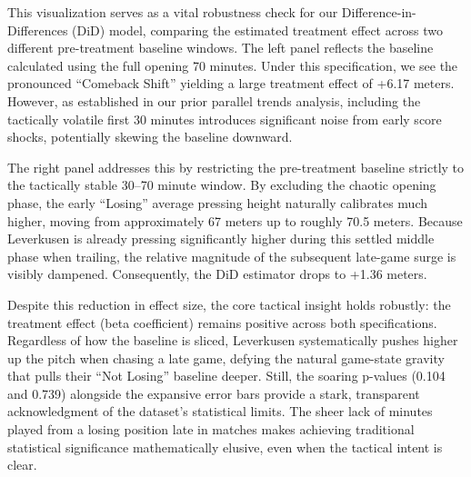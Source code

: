 \documentclass[
]{article}
\begin{document}
This visualization serves as a vital robustness check for our
Difference-in-Differences (DiD) model, comparing the estimated treatment
effect across two different pre-treatment baseline windows. The left
panel reflects the baseline calculated using the full opening 70
minutes. Under this specification, we see the pronounced ``Comeback
Shift'' yielding a large treatment effect of +6.17 meters. However, as
established in our prior parallel trends analysis, including the
tactically volatile first 30 minutes introduces significant noise from
early score shocks, potentially skewing the baseline downward.

The right panel addresses this by restricting the pre-treatment baseline
strictly to the tactically stable 30--70 minute window. By excluding the
chaotic opening phase, the early ``Losing'' average pressing height
naturally calibrates much higher, moving from approximately 67 meters up
to roughly 70.5 meters. Because Leverkusen is already pressing
significantly higher during this settled middle phase when trailing, the
relative magnitude of the subsequent late-game surge is visibly
dampened. Consequently, the DiD estimator drops to +1.36 meters.

Despite this reduction in effect size, the core tactical insight holds
robustly: the treatment effect (beta coefficient) remains positive
across both specifications. Regardless of how the baseline is sliced,
Leverkusen systematically pushes higher up the pitch when chasing a late
game, defying the natural game-state gravity that pulls their ``Not
Losing'' baseline deeper. Still, the soaring p-values (0.104 and 0.739)
alongside the expansive error bars provide a stark, transparent
acknowledgment of the dataset's statistical limits. The sheer lack of
minutes played from a losing position late in matches makes achieving
traditional statistical significance mathematically elusive, even when
the tactical intent is clear.
\end{document}
